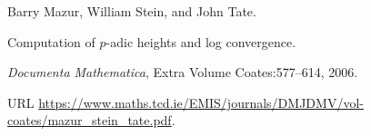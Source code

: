 Barry Mazur, William Stein, and John Tate.

\newblock Computation of $p$-adic heights and log convergence.

\newblock \emph{Documenta Mathematica}, Extra Volume Coates:577--614, 2006.

\newblock URL \url{https://www.maths.tcd.ie/EMIS/journals/DMJDMV/vol-coates/mazur_stein_tate.pdf}.
